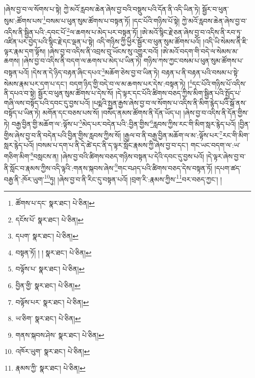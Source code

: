 །ཞེས་བྱ་བ་ལ་སོགས་པ་སྟེ། ཀྱེ་མའོ་རླབས་ཆེན་ཞེས་བྱ་བའི་བསྡུས་པའི་དོན་ནི་འདི་ཡིན་ཏེ། སྦྱོར་བ་ཕུན་སུམ་:ཚོགས་པས་\footnote{ཚོགས་པ་དང་  སྣར་ཐང་།  པེ་ཅིན། }བསམ་པ་ཕུན་སུམ་ཚོགས་པ་བསྟན་ཏོ། །དང་པོའི་གཉིས་པོ་སྟེ། ཀྱེ་མའོ་རླབས་ཆེན་ཞེས་བྱ་བ་འདིས་ནི་སྦྱིན་པའི་:དབང་པོ་\footnote{དངོས་པོ་  སྣར་ཐང་།  པེ་ཅིན། }ལ་ཆགས་པ་མེད་པར་བསྟན་ཏོ། །ཨེ་མའོ་སྙིང་རྗེ་ཅན་ཞེས་བྱ་བ་འདིས་ནི་རབ་ཏུ་འཛིན་པར་བྱེད་པའི་སྙིང་རྗེ་དང་ལྡན་པ་སྟེ། འདི་གཉིས་ཀྱི་ཕྱིར་སྦྱོར་བ་ཕུན་སུམ་ཚོགས་པའོ། །འདི་ཡི་སེམས་ནི་ཇི་ལྟར་རྣམ་དག་ལྟོས། །ཞེས་བྱ་བ་འདིས་ནི་འབྲས་བུ་ཡོངས་སུ་འགྱུར་བའོ། །ཨེ་མའོ་བདག་གི་བདེ་ལ་སེམས་མ་ཆགས། །ཞེས་བྱ་བ་འདིས་ནི་བདག་ལ་ཆགས་པ་མེད་པ་ཡིན་ཏེ། གཉིས་ཀས་ཀྱང་བསམ་པ་ཕུན་སུམ་ཚོགས་པ་བསྟན་པའོ། །དེས་ན་དེ་ཉིད་བརྟན་ཞིང་དཔའ་\footnote{དཔག་  སྣར་ཐང་།  པེ་ཅིན། }མཆོག་ཅེས་བྱ་བ་ཡིན་ཏེ། བརྟན་པ་ནི་བརྟན་པའི་བསམ་པ་སྟེ་སེམས་རྣམ་པར་དག་པ་དང་། བདག་ཉིད་གྱི་བདེ་བ་ལ་མ་ཆགས་པར་དེས་:བསྟན་ཏེ། །\footnote{བསྟན་ཏོ། ། །  སྣར་ཐང་།  པེ་ཅིན། }དང་པོའི་གཉིས་པོ་འདིས་ནི་དཔའ་བ་སྟེ། སྦྱོར་བ་ཕུན་སུམ་ཚོགས་པ་དེས་སོ། །དེ་ལྟར་དང་པོའི་ཚིགས་བཅད་ཀྱིས་མིག་སྦྱིན་པའི་སྤྱོད་པ་གཞི་ལས་བསྟོད་པའི་དབང་དུ་བྱས་པའོ། །པདྨའི་སྤྱན་རྒྱས་ཞེས་བྱ་བ་ལ་སོགས་པ་འདིས་ནི་མིག་རྙེད་པའི་སྒོ་ནས་བསྟོད་པ་ཡིན་ཏེ། མགོན་དང་བཅས་པས་སོ། །བསོད་ནམས་ཚོགས་ནི་དོན་ཡོད་པ། །ཞེས་བྱ་བ་འདིས་ནི་དོན་གྱིས་ཏེ། བརྒྱ་བྱིན་གྱི་མཆོག་ལ་:ལྟོས་པ་\footnote{བལྟོས་པ་  སྣར་ཐང་།  པེ་ཅིན། }མེད་པར་བདེན་པའི་:བྱིན་གྱིས་\footnote{བྱིན་གྱི་  སྣར་ཐང་།  པེ་ཅིན། }རླབས་ཀྱིས་རང་གི་མིག་སླར་རྙེད་པའོ། །བྱིན་གྱིས་ཞེས་བྱ་བ་ནི་བདེན་པའི་བྱིན་གྱིས་རླབས་ཀྱིས་སོ། །རྒྱལ་བ་ནི་བརྒྱ་བྱིན་མཆོག་ལ་མ་:ལྟོས་པར་\footnote{བལྟོས་པར་  སྣར་ཐང་།  པེ་ཅིན། }རང་གི་མིག་སླར་རྙེད་པའོ། །བསམ་པ་དག་པ་ནི་དེ་ཚེ་དང་ནི་ད་ལྟར་སློང་རྣམས་ཀྱི་ཞེས་བྱ་བ་དང་། གང་ཡང་བདག་ལ་:ཡ་གཅིག་མིག་\footnote{ཡ་ཅིག་  སྣར་ཐང་།  པེ་ཅིན། }བསླངས་ན། །ཞེས་བྱ་བའི་ཚིགས་བཅད་གཉིས་བསྟན་པ་དེའི་དབང་དུ་བྱས་པའོ། །དེ་ལྟར་ཞེས་བྱ་བ་ནི་སློང་བ་རྣམས་ཀྱིས་འདི་ལྟའི་:གནས་སྐབས་ཞེས་\footnote{གནས་སྐབས་ཤེས་  སྣར་ཐང་།  པེ་ཅིན། }གང་བཤད་པའི་ཚིགས་བཅད་དེས་བསྟན་ཏོ། །དཔག་ཚད་བརྒྱ་ནི་:ཁོར་ཡུག་\footnote{འཁོར་ཡུག་  སྣར་ཐང་།  པེ་ཅིན། }ཏུ། །ཞེས་བྱ་བ་ནི་རིང་དུ་བསྟན་པའོ། །བྲག་རི་:རྣམས་ཀྱིས་\footnote{རྣམས་ཀྱི་  སྣར་ཐང་།  པེ་ཅིན། }བར་བཅད་ཀྱང་། །
